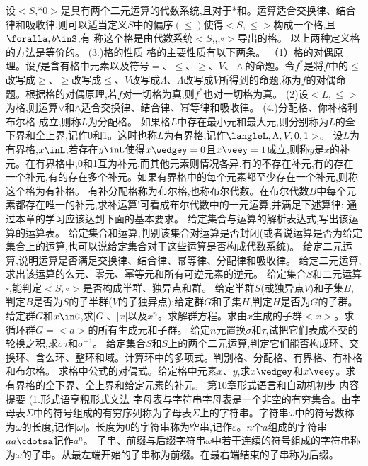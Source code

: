 设$<S$,*$0>$是具有两个二元运算的代数系统,且对于*和。运算适合交换律、结合律和吸收律,则可以适当定义$S$中的偏序$(\leqslant)$使得$<S,\leqslant>$构成一个格,且$\foralla,b\inS$,有
称这个格是由代数系统$<S$,,,$\circ>$导出的格。
以上两种定义格的方法是等价的。
{(3.)格的性质}
格的主要性质有以下两条。
（1）格的对偶原理。设$f$是含有格中元素以及符号$=、\leqslant、\geqslant、V、\wedge$的命题。令$f^{*}$是将$f$中的$\leqslant$改写成$\geqslant、\geqslant$改写成$\leqslant、V$改写成$\Lambda、\Lambda$改写成$V$所得到的命题,称为$f$的对偶命题。根据格的对偶原理,若$f$对一切格为真,则$f^{*}$也对一切格为真。
(2)设$<L,\leqslant>$为格,则运算$\vee$和$\wedge$适合交换律、结合律、幂等律和吸收律。
(4.)分配格、你补格利布尔格
成立,则称$L$为分配格。
如果格$L$中存在最小元和最大元,则分别称为$L$的全下界和全上界,记作0和1。这时也称$L$为有界格,记作$\langleL,\Lambda,V,0,1>$。
设$L$为有界格,$x\inL$,若存在$y\inL$使得$x\wedgey=0$且$x\veey=1$成立,则称$y$是$x$的补元。在有界格中,0和1互为补元,而其他元素则情况各异,有的不存在补元,有的存在一个补元,有的存在多个补元。如果有界格中的每个元素都至少存在一个补元,则称这个格为有补格。
有补分配格称为布尔格,也称布尔代数。在布尔代数$B$中每个元素都存在唯一的补元,求补运算'可看成布尔代数中的一元运算,并满足下述算律:
通过本章的学习应该达到下面的基本要求。
给定集合与运算的解析表达式,写出该运算的运算表。
给定集合和运算,判别该集合对运算是否封闭(或者说运算是否为给定集合上的运算,也可以说给定集合对于这些运算是否构成代数系统)。
给定二元运算,说明运算是否满足交换律、结合律、幂等律、分配律和吸收律。
给定二元运算,求出该运算的么元、零元、幂等元和所有可逆元素的逆元。
给定集合$S$和二元运算॰,能判定$<S,\circ>$是否构成半群、独异点和群。
给定半群$S$(或独异点$V$)和子集$B$,判定$B$是否为$S$的子半群($V$的子独异点);给定群$G$和子集$H$,判定$H$是否为$G$的子群。
给定群$G$和$x\inG$,求$|G|$、$|x|$以及$x^{n}$。求解群方程。求由$x$生成的子群$<x>$。求循环群$G=<a>$的所有生成元和子群。
给定$n$元置换$\sigma$和$\tau$,试把它们表成不交的轮换之积,求$\sigma\tau$和$\sigma^{-1}$。
给定集合$S$和$S$上的两个二元运算,判定它们能否构成环、交换环、含么环、整环和域。计算环中的多项式。判别格、分配格、有界格、有补格和布尔格。
求格中公式的对偶式。给定格中元素$x、y$,求$x\wedgey$和$x\veey$。求有界格的全下界、全上界和给定元素的补元。
{第10章形式语言和自动机初步}
{内容提要}
{(1.形式语享䅐形式文法}
字母表与字符串字母表是一个非空的有穷集合。由字母表$\Sigma$中的符号组成的有穷序列称为字母表$\Sigma$上的字符串。字符串$\omega$中的符号数称为$\omega$的长度,记作$|\omega|$。长度为0的字符串称为空串,记作$\varepsilon。n$个$a$组成的字符串$aa\cdotsa$记作$a^{n}$。
子串、前缀与后缀字符串$\omega$中若干连续的符号组成的字符串称为$\omega$的子串。从最左端开始的子串称为前缀。在最右端结束的子串称为后缀。
